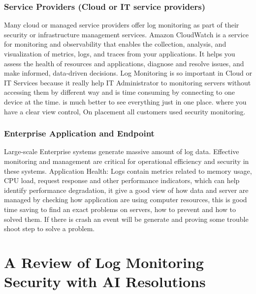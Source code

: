 \subsubsection{Service Providers (Cloud or IT service providers)}
Many cloud or managed service providers offer log monitoring as part of their security or infrastructure management services. Amazon CloudWatch is a service for monitoring and observability that enables the collection, analysis, and visualization of metrics, logs, and traces from your applications. It helps you assess the health of resources and applications, diagnose and resolve issues, and make informed, data-driven decisions. Log Monitoring is so important in Cloud or IT Services because it really help IT Administrator to monitoring servers without accessing them by different way and is time consuming by connecting to one device at the time. is much better to see everything just in one place. where you have a clear view control, On placement all customers used security monitoring. \cite{6231620}

\subsubsection{Enterprise Application and Endpoint}Large-scale Enterprise systems generate massive amount of log data. Effective monitoring and management are critical for operational efficiency and security in these systems. Application Health: Logs contain metrics related to memory usage, CPU load, request response and other performance indicators, which can help identify performance degradation, it give a good view of how data and server are managed by checking how application are using computer resources, this is good time saving to find an exact problems on servers, how to prevent and how to solved them. If there is crash an event will be generate and proving some trouble shoot step to solve a problem.


\section{A Review of Log Monitoring Security with AI Resolutions}

